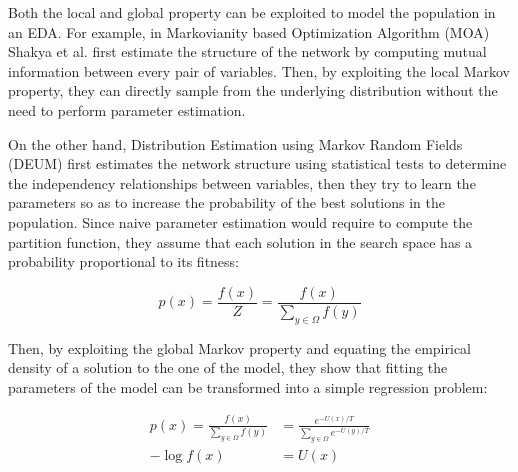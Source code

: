 Both the local and global property can be exploited to model the population in an EDA. For example, in Markovianity based Optimization Algorithm (MOA) \cite{shakya_moa_2011} Shakya et al. first estimate the structure of the network by computing mutual information between every pair of variables. Then, by exploiting the local Markov property, they can directly sample from the underlying distribution without the need to perform parameter estimation.

On the other hand, Distribution Estimation using Markov Random Fields (DEUM) \cite{shakya_deum_2012} first estimates the network structure using statistical tests to determine the independency relationships between variables, then they try to learn the parameters so as to increase the probability of the best solutions in the population. Since naive parameter estimation would require to compute the partition function, they assume that each solution in the search space has a probability proportional to its fitness:

\begin{equation*}
    p(x) = \frac{f(x)}{Z} = \frac{f(x)}{\sum_{y \in \Omega} f(y)}
\end{equation*}

Then, by exploiting the global Markov property and equating the empirical density of a solution to the one of the model, they show that fitting the parameters of the model can be transformed into a simple regression problem:

\begin{align*}
    p(x) = \frac{f(x)}{\sum_{y \in \Omega} f(y)} & = \frac{e^{-U(x)/T}}{\sum_{y \in \Omega} e^{-U(y)/T}} \\
    -\log f(x)                                   & = U(x)
\end{align*}

